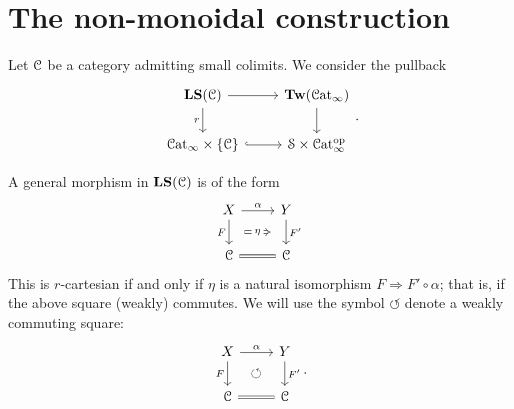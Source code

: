 \documentclass[main.tex]{subfiles}
\begin{document}
\section{The non-monoidal construction}
\label{sec:the_non_monoidal_construction}

Let $\mathcal{C}$ be a category admitting small colimits. We consider the pullback
\begin{equation*}
  \begin{tikzcd}
    \LS(\category{C})
    \arrow[r]
    \arrow[d, swap, "r"]
    & \Tw(\ICat)
    \arrow[d]
    \\
    \ICat \times \{\category{C}\}
    \arrow[r, hook]
    & \S \times \ICat\op
  \end{tikzcd}.
\end{equation*}

A general morphism in $\mathbf{LS}(\mathcal{C})$ is of the form
\begin{equation*}
  \begin{tikzcd}
    X
    \arrow[r, "\alpha"]
    \arrow[d, ""{name=L, right}, "F"{left}]
    & Y
    \arrow[d, ""{name=R, left}, "F'"{right}]
    \\
    \category{C}
    & \category{C}
    \arrow[l, equals]
    \arrow[Rightarrow, from=L, to=R, shorten=1.5ex, "\eta"{description}]
  \end{tikzcd}
\end{equation*}
This is $r$-cartesian if and only if $\eta$ is a natural isomorphism $F \Rightarrow F' \circ \alpha$; that is, if the above square (weakly) commutes. We will use the symbol $\circlearrowleft$ denote a weakly commuting square:
\begin{equation*}
  \begin{tikzcd}
    X
    \arrow[r, "\alpha"]
    \arrow[d, ""{name=L, right}, "F"{left}]
    & Y
    \arrow[d, ""{name=R, left}, "F'"{right}]
    \\
    \category{C}
    & \category{C}
    \arrow[l, equals]
    \arrow[Rightarrow, from=L, to=R, shorten=1.5ex, phantom, "\circlearrowleft"]
  \end{tikzcd}.
\end{equation*}
\end{document}

